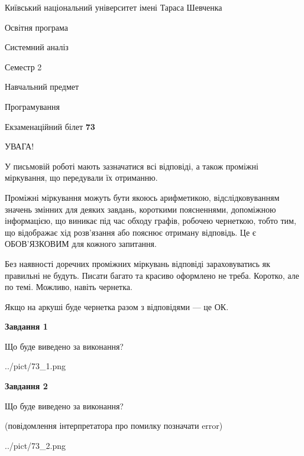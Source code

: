\documentclass[12pt, ukrainian]{article}
\begin{document}
{{\begin {small}\par
{ \center  Київський національний університет імені Тараса Шевченка \par}
{\parbox {5 cm}{Освітня програма \hfill}{\parbox {7 cm}{Системний аналіз \hfill}}\parbox {6 cm}{\hfill Семестр 2}}\par
{\parbox {5 cm} {Навчальний предмет \hfill}\parbox {7 cm}{Програмування \hfill}\parbox {6cm}{\hfill}\par}\vspace{-7pt} \end{small}}{\center Екзаменаційний білет \No \textbf
{ 73 }\par}}
{
\begin {large}
УВАГА!

У письмовій роботі мають зазначатися всі відповіді, а також проміжні міркування, що передували їх отриманню.

Проміжні міркування можуть бути якоюсь арифметикою, відслідковуванням зна\-чень змінних для деяких завдань,
короткими поясненнями, допоміжною інформацією, що виникає під час обходу графів, робочею чернеткою,
тобто тим, що відображає хід розв’язання або пояснює отриману відповідь.
Це є ОБОВ’ЯЗКОВИМ для кожного запитання.

Без наявності доречних проміжних міркувань відповіді зараховуватись як правиль\-ні не будуть.
Писати багато та красиво оформлено не треба. Коротко, але по темі. Можли\-во, навіть чернетка.

Якщо на аркуші буде чернетка разом з відповідями --- це ОК.

\newpage

{\begin {center}\textbf{Завдання 1}\end {center}}\par
Що буде виведено за виконання?\par
\begin{center}
	{../pict/73_1.png}
\end{center}
\newpage

{\begin {center}\textbf{Завдання 2}\end {center}}\par
Що буде виведено за виконання?\par
 (повідомлення інтерпретатора про помилку позначати error)\par
\begin{center}
	{../pict/73_2.png}
\end{center}
\newpage


\end{large}}
\end{document}
